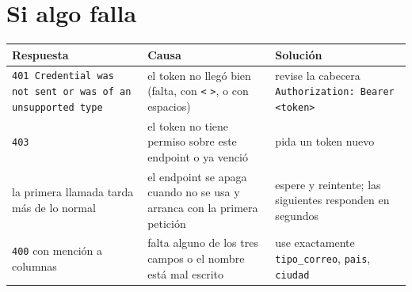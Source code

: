 \documentclass[11pt,a4paper]{article}
\begin{document}
\section*{Si algo falla}
\begin{tabular}{@{}L{4.6cm}L{5.4cm}L{5.5cm}@{}}
\toprule
\textbf{Respuesta} & \textbf{Causa} & \textbf{Solución} \tabularnewline
\midrule
\texttt{401 Credential was not sent or was of an unsupported type} & el token no llegó bien (falta, con \texttt{<} \texttt{>}, o con espacios) & revise la cabecera \texttt{Authorization: Bearer <token>} \tabularnewline
\texttt{403} & el token no tiene permiso sobre este endpoint o ya venció & pida un token nuevo \tabularnewline
la primera llamada tarda más de lo normal & el endpoint se apaga cuando no se usa y arranca con la primera petición & espere y reintente; las siguientes responden en segundos \tabularnewline
\texttt{400} con mención a columnas & falta alguno de los tres campos o el nombre está mal escrito & use exactamente \texttt{tipo\_correo}, \texttt{pais}, \texttt{ciudad} \tabularnewline
\bottomrule
\end{tabular}
\end{document}
